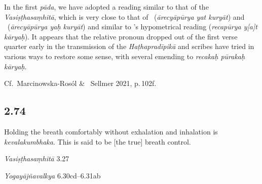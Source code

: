 \begin{ekdosis}
\begin{philcomm}[hp02_073]
In the first \textit{pāda}, we have adopted a reading similar to that of the \emph{Vasiṣṭhasaṃhitā}, which is very close to that of \deltaOne \ (\emph{ārecyāpūrya yat kuryāt}) and \deltaThree \ (\emph{ārecyāpūrya yaḥ kuryāt}) and similar to \alphaTwo’s hypometrical reading (\emph{recapūrya y\emph{[}a\emph{]}t kāryaḥ}). It appears that the relative pronoun dropped out of the first verse quarter early in the transmission of the \emph{Haṭhapradīpikā} and scribes have tried in various ways to restore some sense, with several emending to \emph{recakaḥ pūrakaḥ kāryaḥ}. 

Cf.~Marcinowska-Rosól \& \ Sellmer 2021, p.\,102f.


\end{philcomm}



\subsection*{2.74}
\begin{translation}[hp02_074]
Holding the breath comfortably without exhalation and inhalation is \emph{kevalakumbhaka}. This is said to be [the true] breath control. 
\end{translation}

\begin{sources}[hp02_074]
\emph{Vasiṣṭhasaṃhitā} 3.27

\begin{versinnote}
\end{versinnote}

\emph{Yogayājñavalkya} 6.30cd–6.31ab

\begin{versinnote}
\end{versinnote}
\end{sources}


\end{ekdosis}
